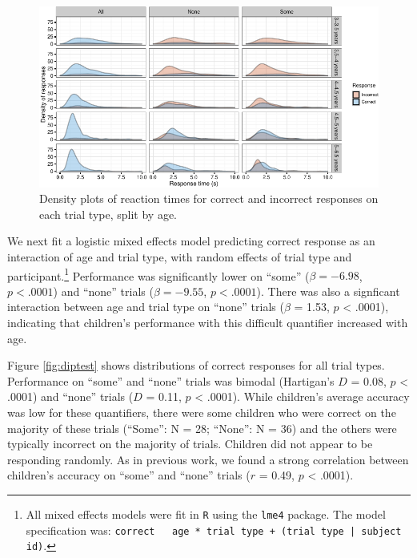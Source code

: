 \documentclass[10pt, letterpaper]{article}
\newenvironment{CodeChunk}{}{}
\begin{document}
\begin{CodeChunk}
\begin{figure}[t]

{\centering \includegraphics{figs/dense-1} 

}

\caption[Density plots of reaction times for correct and incorrect responses on each trial type, split by age]{Density plots of reaction times for correct and incorrect responses on each trial type, split by age.}\label{fig:dense}
\end{figure}
\end{CodeChunk}

We next fit a logistic mixed effects model predicting correct response
as an interaction of age and trial type, with random effects of trial
type and
participant.\footnote{All mixed effects models were fit in \texttt{R} using the \texttt{lme4} package. The model specification was: \texttt{correct ~ age * trial type + (trial type | subject id)}.}
Performance was significantly lower on ``some'' (\(\beta = -6.98\),
\(p < .0001\)) and ``none'' trials (\(\beta = -9.55\), \(p < .0001\)).
There was also a signficant interaction between age and trial type on
``none'' trials (\(\beta\) = 1.53, \(p\) \textless{} .0001), indicating
that children's performance with this difficult quantifier increased
with age.

Figure \ref{fig:diptest} shows distributions of correct responses for
all trial types. Performance on ``some'' and ``none'' trials was bimodal
(Hartigan's \(D\) = 0.08, \(p\) \textless{} .0001) and ``none'' trials
(\(D\) = 0.11, \(p\) \textless{} .0001). While children's average
accuracy was low for these quantifiers, there were some children who
were correct on the majority of these trials (``Some'': N = 28;
``None'': N = 36) and the others were typically incorrect on the
majority of trials. Children did not appear to be responding randomly.
As in previous work, we found a strong correlation between children's
accuracy on ``some'' and ``none'' trials (\(r\) = 0.49, \(p\)
\textless{} .0001).
\end{document}
